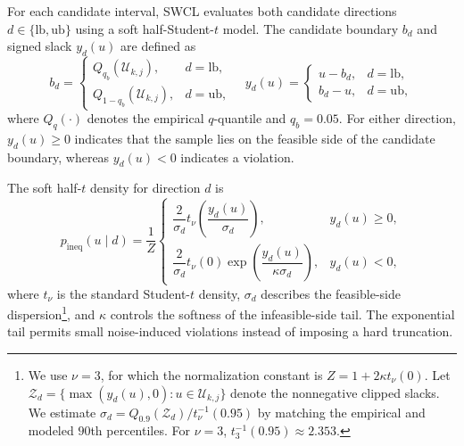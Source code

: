 \documentclass[lettersize,journal]{IEEEtran}
\begin{document}
For each candidate interval, SWCL evaluates both candidate directions $d\in\{\mathrm{lb},\mathrm{ub}\}$ using a soft half-Student-$t$ model. The candidate boundary $b_d$ and signed slack $y_d(u)$ are defined as
\begin{equation}
b_d=
\begin{cases}
Q_{q_b}(\mathcal{U}_{k,j}), & d=\mathrm{lb},\\
Q_{1-q_b}(\mathcal{U}_{k,j}), & d=\mathrm{ub},
\end{cases}
\quad
y_d(u)=
\begin{cases}
u-b_d, & d=\mathrm{lb},\\
b_d-u, & d=\mathrm{ub},
\end{cases}
\label{eq:ineq_boundary_slack}
\end{equation}
where $Q_q(\cdot)$ denotes the empirical $q$-quantile and $q_b=0.05$. For either direction, $y_d(u)\geq0$ indicates that the sample lies on the feasible side of the candidate boundary, whereas $y_d(u)<0$ indicates a violation.

The soft half-$t$ density for direction $d$ is
\begin{equation}
p_{\mathrm{ineq}}(u\mid d)
=
\frac{1}{Z}
\begin{cases}
\dfrac{2}{\sigma_d}
t_\nu\!\left(
\dfrac{y_d(u)}{\sigma_d}
\right),
& y_d(u)\geq0,\\[0.9em]
\dfrac{2}{\sigma_d}
t_\nu(0)
\exp\!\left(
\dfrac{y_d(u)}{\kappa\sigma_d}
\right),
& y_d(u)<0,
\end{cases}
\label{eq:soft_half_t_density}
\end{equation}
where $t_\nu$ is the standard Student-$t$ density, $\sigma_d$ describes the feasible-side dispersion\footnote{We use $\nu=3$, for which the normalization constant is $Z=1+2\kappa t_\nu(0)$. Let $\mathcal{Z}_d=\{\max(y_d(u),0):u\in\mathcal{U}_{k,j}\}$ denote the nonnegative clipped slacks. We estimate $\sigma_d=Q_{0.9}(\mathcal{Z}_d)/t_\nu^{-1}(0.95)$ by matching the empirical and modeled $90$th percentiles. For $\nu=3$, $t_3^{-1}(0.95)\approx2.353$.}, and $\kappa$ controls the softness of the infeasible-side tail. The exponential tail permits small noise-induced violations instead of imposing a hard truncation. 
\end{document}
